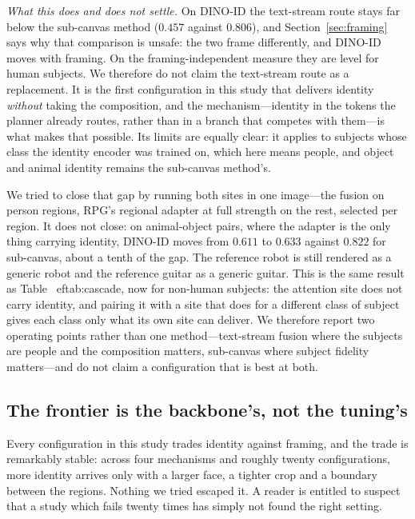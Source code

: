\documentclass[10pt,twocolumn,letterpaper]{article}
\begin{document}
\noindent\textit{What this does and does not settle.}
On DINO-ID the text-stream route stays far below the sub-canvas method
($0.457$ against $0.806$), and Section~\ref{sec:framing} says why that
comparison is unsafe: the two frame differently, and DINO-ID moves with
framing.  On the framing-independent measure they are level for human
subjects.  We therefore do not claim the text-stream route as a replacement.
It is the first configuration in this study that delivers identity
\emph{without} taking the composition, and the mechanism---identity in the
tokens the planner already routes, rather than in a branch that competes with
them---is what makes that possible.  Its limits are equally clear: it applies
to subjects whose class the identity encoder was trained on, which here means
people, and object and animal identity remains the sub-canvas method's.

We tried to close that gap by running both sites in one image---the fusion on
person regions, RPG's regional adapter at full strength on the rest, selected
per region.  It does not close: on animal-object pairs, where the adapter is
the only thing carrying identity, DINO-ID moves from $0.611$ to $0.633$
against $0.822$ for sub-canvas, about a tenth of the gap.  The reference
robot is still rendered as a generic robot and the reference guitar as a
generic guitar.  This is the same result as
Table~
ef{tab:cascade}, now for non-human subjects: the attention site does
not carry identity, and pairing it with a site that does for a different class
of subject gives each class only what its own site can deliver.  We therefore
report two operating points rather than one method---text-stream fusion where
the subjects are people and the composition matters, sub-canvas where subject
fidelity matters---and do not claim a configuration that is best at both.

\subsection{The frontier is the backbone's, not the tuning's}
\label{sec:architecture}

Every configuration in this study trades identity against framing, and the
trade is remarkably stable: across four mechanisms and roughly twenty
configurations, more identity arrives only with a larger face, a tighter crop
and a boundary between the regions.  Nothing we tried escaped it.  A reader is
entitled to suspect that a study which fails twenty times has simply not found
the right setting.
\end{document}
